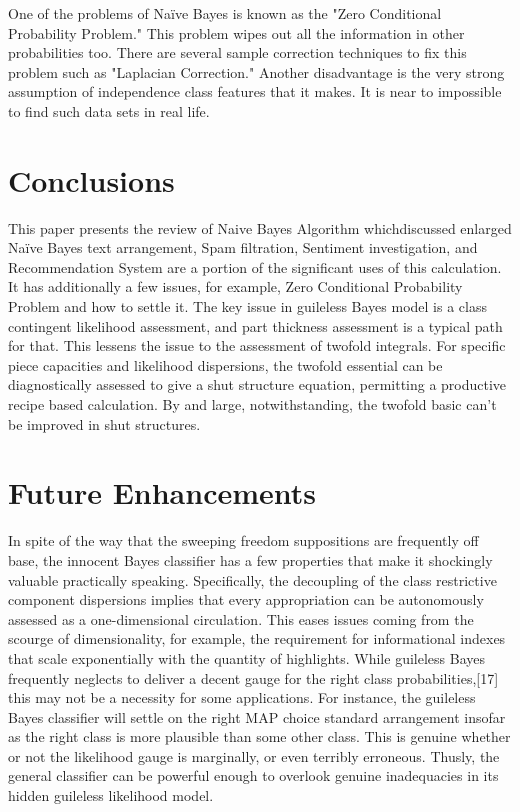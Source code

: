 \documentclass[letterpaper,12pt]{article}
\begin{document}
One of the problems of Naïve Bayes is known as the "Zero Conditional Probability Problem." This problem wipes
out all the information in other probabilities too. There are several sample correction techniques to fix this problem
such as "Laplacian Correction."
Another disadvantage is the very strong assumption of independence class features that it makes. It is near to
impossible to find such data sets in real life.




\section{Conclusions}
This paper presents the review of Naive Bayes Algorithm whichdiscussed enlarged Naïve Bayes text arrangement, Spam filtration, Sentiment investigation, and Recommendation System are a portion of the significant uses of this calculation. It has additionally a few issues, for example, Zero Conditional Probability Problem and how to settle it. The key issue in guileless Bayes model is a class contingent likelihood assessment, and part thickness assessment is a typical path for that. This lessens the issue to the assessment of twofold integrals. For specific piece capacities and likelihood dispersions, the twofold essential can be diagnostically assessed to give a shut structure equation, permitting a productive recipe based calculation. By and large, notwithstanding, the twofold basic can't be improved in shut structures.




\section{Future Enhancements}
In spite of the way that the sweeping freedom suppositions are frequently off base, the innocent Bayes classifier has a few properties that make it shockingly valuable practically speaking. Specifically, the decoupling of the class restrictive component dispersions implies that every appropriation can be autonomously assessed as a one-dimensional circulation. This eases issues coming from the scourge of dimensionality, for example, the requirement for informational indexes that scale exponentially with the quantity of highlights. While guileless Bayes frequently neglects to deliver a decent gauge for the right class probabilities,[17] this may not be a necessity for some applications. For instance, the guileless Bayes classifier will settle on the right MAP choice standard arrangement insofar as the right class is more plausible than some other class. This is genuine whether or not the likelihood gauge is marginally, or even terribly erroneous. Thusly, the general classifier can be powerful enough to overlook genuine inadequacies in its hidden guileless likelihood model.
\end{document}
